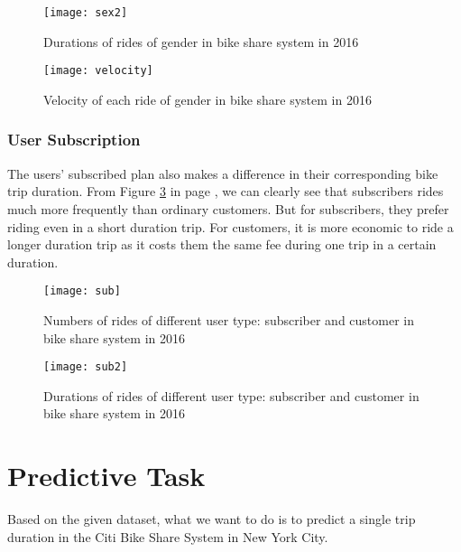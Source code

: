 		  \begin{figure}[h]
		  \centering
		  \texttt{[image: sex2]}
		  \caption{Durations of rides of gender in bike share system in 2016}
		  \label{fig_sex2}
		  \end{figure}

		  \begin{figure}[h]
		  \centering
		  \texttt{[image: velocity]}
		  \caption{Velocity of each ride of gender in bike share system in 2016}
		  \label{fig_vel}
		  \end{figure}

	\subsubsection{User Subscription}
	The users' subscribed plan also makes a difference in their corresponding bike trip duration. From Figure \ref{fig_sub} in page \pageref{fig_sub}, we can clearly see that subscribers rides much more frequently than ordinary customers. But for subscribers, they prefer riding even in a short duration trip. For customers, it is more economic to ride a longer duration trip as it costs them the same fee during one trip in a certain duration.
		  \begin{figure}[h]
		  \centering
		  \texttt{[image: sub]}
		  \caption{Numbers of rides of different user type: subscriber and customer in bike share system in 2016}
		  \label{fig_sub}
		  \end{figure}

		  \begin{figure}[h]
		  \centering
		  \texttt{[image: sub2]}
		  \caption{Durations of rides of different user type: subscriber and customer in bike share system in 2016}
		  \label{fig_sub2}
		  \end{figure}

\section{Predictive Task}
Based on the given dataset, what we want to do is to predict a single trip duration in the Citi Bike Share System in New York City.

